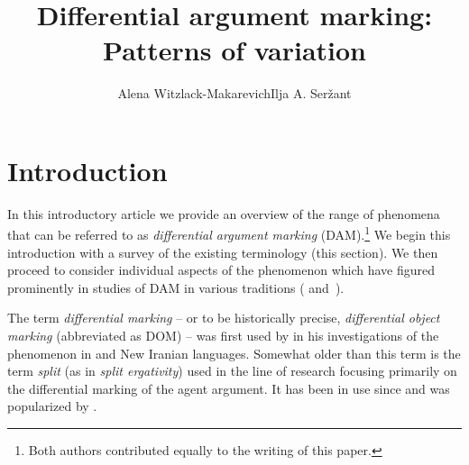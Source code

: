 \documentclass[output=paper]{LSP/langsci}
\author{Alena Witzlack-Makarevich\affiliation{University of Kiel}\lastand Ilja A. Seržant\affiliation{Leipzig University}}
\title{Differential argument marking: Patterns of variation}
\begin{document}
 
\section{Introduction}
\label{01-wi-sec:Introduction}
In this introductory article we provide an overview of the range of phenomena that can be referred to as \textit{differential argument marking} (DAM).\footnote{Both authors contributed equally to the writing of this paper.} 
We begin this introduction with a survey of the existing terminology (this section). 
We then proceed to consider individual aspects of the phenomenon which have figured prominently in studies of DAM in various traditions ( and~).

The term \textit{differential marking} – or to be historically precise, \textit{differential object marking} (abbreviated as DOM) – was first used by \citet{Bossong1982Praepositionale, Bossong1985Differentielle} in his investigations of the phenomenon in  and New Iranian languages. 
Somewhat older than this term is the term \textit{split} (as in \textit{split ergativity}) used in the line of research focusing primarily on the differential marking of the agent argument. 
It has been in use since \citet{Silverstein1976Hierarchy} and was popularized by \citet{Dixon1979Ergativity, Dixon1994Ergativity}. 
\end{document}
